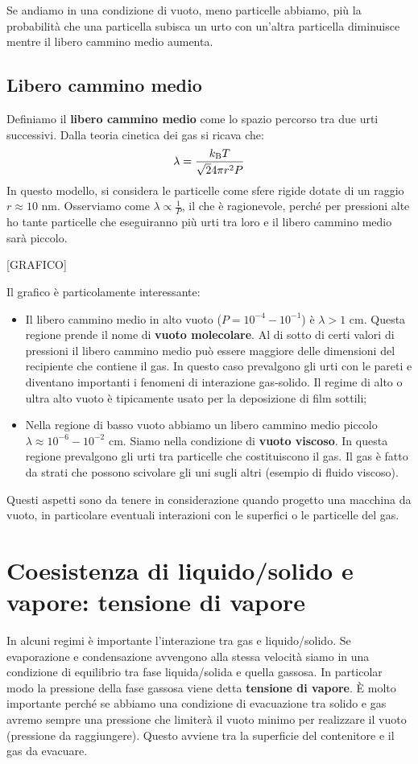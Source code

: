 Se andiamo in una condizione di vuoto, meno particelle abbiamo, più la probabilità che una particella subisca un urto con un'altra particella diminuisce mentre il libero cammino medio aumenta.

\subsection{Libero cammino medio}
Definiamo il \textbf{libero cammino medio} come lo spazio percorso tra due urti successivi. Dalla teoria cinetica dei gas si ricava che:
\begin{equation*}
    \lambda = \frac{k_{\text B}T}{\sqrt 2 4 \pi r^2P}
\end{equation*}
In questo modello, si considera le particelle come sfere rigide dotate di un raggio $r \approx 10 \text{ nm}$. Osserviamo come $\lambda \propto \frac 1 P$, il che è ragionevole, perché per pressioni alte ho tante particelle che eseguiranno più urti tra loro e il libero cammino medio sarà piccolo.

[GRAFICO]

Il grafico è particolamente interessante:
\begin{itemize}
    \item Il libero cammino medio in alto vuoto ($P = 10^{-4}-10^{-1}$) è $ \lambda > 1 \text{ cm}$. Questa regione prende il nome di \textbf{vuoto molecolare}. Al di sotto di certi valori di pressioni il libero cammino medio può essere maggiore delle dimensioni del recipiente che contiene il gas. In questo caso prevalgono gli urti con le pareti e diventano importanti i fenomeni di interazione gas-solido. Il regime di alto o ultra alto vuoto è tipicamente usato per la deposizione di film sottili;
    \item Nella regione di basso vuoto abbiamo un libero cammino medio piccolo $\lambda \approx 10^{-6}-10^{-2}\text{ cm}$. Siamo nella condizione di \textbf{vuoto viscoso}. In questa regione prevalgono gli urti tra particelle che costituiscono il gas. Il gas è fatto da strati che possono scivolare gli uni sugli altri (esempio di fluido viscoso).
\end{itemize}
Questi aspetti sono da tenere in considerazione quando progetto una macchina da vuoto, in particolare eventuali interazioni con le superfici o le particelle del gas.

\section{Coesistenza di liquido/solido e vapore: tensione di vapore}
In alcuni regimi è importante l'interazione tra gas e liquido/solido. Se evaporazione e condensazione avvengono alla stessa velocità siamo in una condizione di equilibrio tra fase liquida/solida e quella gassosa. In particolar modo la pressione della fase gassosa viene detta \textbf{tensione di vapore}. È molto importante perché se abbiamo una condizione di evacuazione tra solido e gas avremo sempre una pressione che limiterà il vuoto minimo per realizzare il vuoto (pressione da raggiungere). Questo avviene tra la superficie del contenitore e il gas da evacuare.

